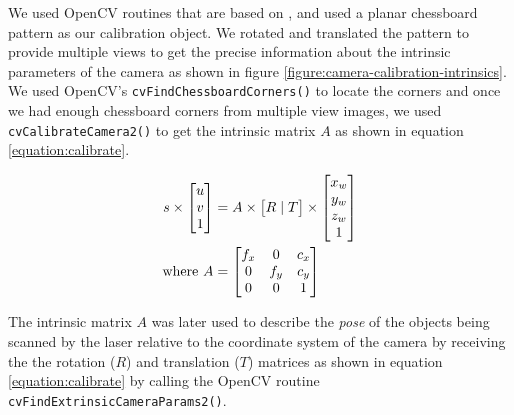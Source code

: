 We used OpenCV routines that are based on \cite{zhang:2000}, \cite{brown:1971} and used a planar chessboard pattern as our calibration object. We rotated and translated the pattern to provide multiple views to get the precise information about the intrinsic parameters of the camera as shown in figure \ref{figure:camera-calibration-intrinsics}. 
We used OpenCV's \texttt{cvFindChessboardCorners()} to locate the corners and once we had enough chessboard corners from multiple view images, we used \texttt{cvCalibrateCamera2()} to get the intrinsic matrix $A$ as shown in equation \ref{equation:calibrate}.


\begin{align}
	\label{equation:calibrate}				
	s \times 
	\begin{bmatrix}
		u \\ v \\	1 \\
	\end{bmatrix} &= A \times \begin{bmatrix}
															R \mid T
	 				  								\end{bmatrix} 
										 \times \begin{bmatrix}
															x_w \\ y_w \\ z_w \\ 1
														\end{bmatrix} \\
	\text{where}~	 
	A &= \begin{bmatrix}
					f_x & 0 & c_x \\
					0 & f_y & c_y \\
					0 & 0 & 1 \\										
 		 	 \end{bmatrix} \notag
\end{align}

The intrinsic matrix $A$ was later used to describe the \emph{pose} of the objects being scanned by the laser relative to the coordinate system of the camera by receiving the the rotation ($R$) and translation ($T$) matrices as shown in equation \ref{equation:calibrate} by calling the OpenCV routine \texttt{cvFindExtrinsicCameraParams2()}.

